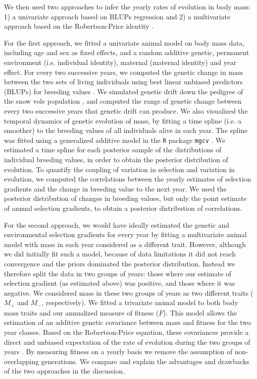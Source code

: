 We then used two approaches to infer the yearly rates of evolution in body mass: 1) a univariate approach based on BLUPs regression \parencite{Henderson1950, Hadfield2012} and 2) a multivariate approach based on the Robertson-Price identity \parencite{Price1970, Morrissey2012sts, Bonnet2016}. 

For the first approach, we fitted a univariate animal model on body mass data, including age and sex as fixed effects, and a random additive genetic, permanent environment (i.e. individual identity), maternal (maternal identity) and year effect. For every two successive years, we computed the genetic change in mass between the two sets of living individuals using best linear unbiased predictors (BLUPs) for breeding values \parencite[following][]{Hadfield2012}. We simulated genetic drift down the pedigree of the snow vole population \parencite[following][and using the function \texttt{rbv()} in \texttt{MCMCglmm}]{Hadfield2010b}, and computed the range of genetic change between every two successive years that genetic drift can produce.
We also visualized the temporal dynamics of genetic evolution of mass, by fitting a time spline (i.e. a smoother) to the breeding values of all individuals alive in each year. The spline was fitted using a generalized additive model in the \texttt{R} package \texttt{mgcv} \parencite{Wood2011}. We estimated a time spline for each posterior sample of the distributions of individual breeding values, in order to obtain the posterior distribution of evolution. 
To quantify the coupling of variation in selection and variation in evolution, we computed the correlations between the yearly estimates of selection gradients and the change in breeding value to the next year. We used the posterior distribution of changes in breeding values, but only the point estimate of annual selection gradients, to obtain a posterior distribution of correlations. 

For the second approach, we would have ideally estimated the genetic and environmental selection gradients for every year by fitting a multivariate animal model with mass in each year considered as a different trait. However, although we did initially fit such a model, because of data limitations it did not reach convergence and the priors dominated the posterior distribution. Instead we therefore split the data in two groups of years: those where our estimate of selection gradient (as estimated above) was positive, and those where it was negative. We considered mass in these two groups of years as two different traits ($M_+$ and $M_-$, respectively). We fitted a trivariate animal model to both body mass traits and our annualized measure of fitness ($F$). This model allows the estimation of an additive genetic covariance between mass and fitness for the two year classes. Based on the Robertson-Price equation, these covariances provide a direct and unbiased expectation of the rate of evolution during the two groups of years \parencite{Robertson1966,Price1970, Price1972cov,Frank2012IV, Morrissey2012sts}. By measuring fitness on a yearly basis we remove the assumption of non-overlapping generations. We compare and explain the advantages and drawbacks of the two approaches in the discussion. 


